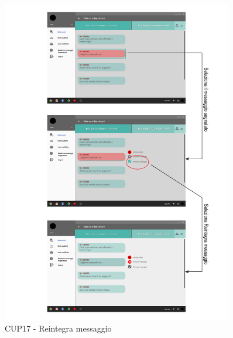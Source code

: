 \begin{figure}
	\centering
	\includegraphics[width=0.9\textwidth]{imgs/gruppo6/activities/act_cup17_reintegra_messaggio.pdf}
	\caption{CUP17  - Reintegra messaggio}
	\label{fig:act-cup17}
\end{figure}

